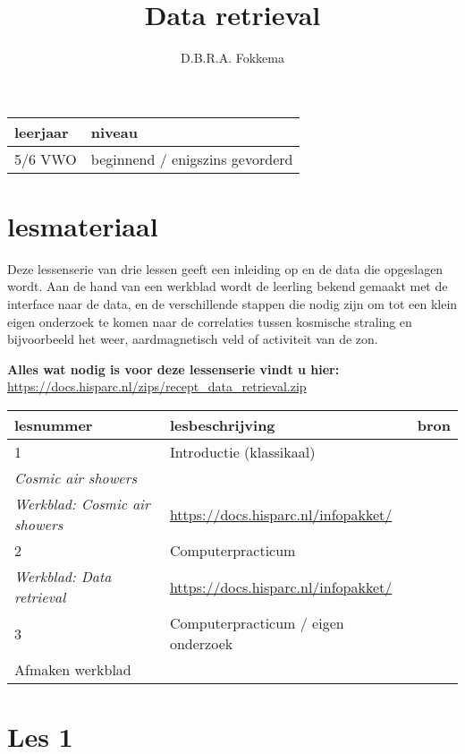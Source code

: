 

\title{Data retrieval}
\author{D.B.R.A. Fokkema}



\maketitle

\begin{tabular}{|>{\raggedright}p{3cm}|>{\raggedright}p{12cm}|}
\hline
leerjaar & niveau \tabularnewline
\hline
5/6 VWO & beginnend / enigszins gevorderd \tabularnewline
\hline
\end{tabular}


\section{lesmateriaal}

Deze lessenserie van drie lessen geeft een inleiding op \hisparc en de
data die opgeslagen wordt. Aan de hand van een werkblad wordt de leerling
bekend gemaakt met de interface naar de \hisparc data, en de verschillende
stappen die nodig zijn om tot een klein eigen onderzoek te komen naar de
correlaties tussen kosmische straling en bijvoorbeeld het weer,
aardmagnetisch veld of activiteit van de zon.

\textbf{Alles wat nodig is voor deze lessenserie vindt u hier:}
\url{https://docs.hisparc.nl/zips/recept_data_retrieval.zip}

\begin{tabular}{ |>{\raggedright}p{2.5cm}|>{\raggedright}p{8cm}|>{\raggedright}p{4cm}|}
\hline
lesnummer & lesbeschrijving & bron \tabularnewline
\hline
1 & Introductie (klassikaal) \\
\emph{Cosmic air showers} \\
\emph{Werkblad: Cosmic air showers}
& \url{https://docs.hisparc.nl/infopakket/} \tabularnewline
\hline
2 & Computerpracticum \\
\emph{Werkblad: Data retrieval}
& \url{https://docs.hisparc.nl/infopakket/} \tabularnewline
\hline
3 & Computerpracticum / eigen onderzoek \\
Afmaken werkblad
& \tabularnewline
\hline
\end{tabular}


\section{Les 1}

